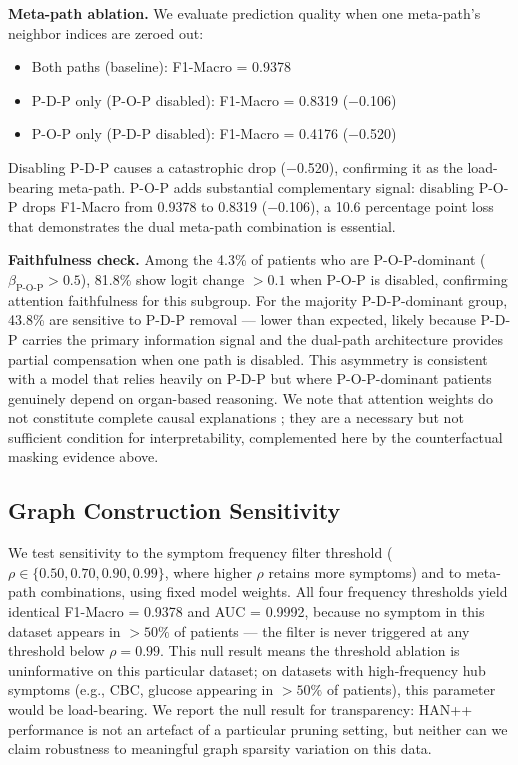 \documentclass[conference]{IEEEtran}
\begin{document}
\textbf{Meta-path ablation.}
We evaluate prediction quality when one meta-path's neighbor indices are zeroed out:
\begin{itemize}
  \item Both paths (baseline): F1-Macro = 0.9378
  \item P-D-P only (P-O-P disabled): F1-Macro = 0.8319 ($-$0.106)
  \item P-O-P only (P-D-P disabled): F1-Macro = 0.4176 ($-$0.520)
\end{itemize}
Disabling P-D-P causes a catastrophic drop ($-$0.520), confirming it as the
load-bearing meta-path.
P-O-P adds substantial complementary signal: disabling P-O-P drops
F1-Macro from 0.9378 to 0.8319 ($-$0.106), a 10.6 percentage point loss
that demonstrates the dual meta-path combination is essential.

\textbf{Faithfulness check.}
Among the 4.3\% of patients who are P-O-P-dominant
($\beta_{\text{P-O-P}} > 0.5$), 81.8\% show logit change $> 0.1$ when
P-O-P is disabled, confirming attention faithfulness for this subgroup.
For the majority P-D-P-dominant group, 43.8\% are sensitive to P-D-P
removal --- lower than expected, likely because P-D-P carries the primary
information signal and the dual-path architecture provides partial
compensation when one path is disabled.
This asymmetry is consistent with a model that relies heavily on P-D-P
but where P-O-P-dominant patients genuinely depend on organ-based
reasoning.
We note that attention weights do not constitute complete causal
explanations \cite{jain_2019}; they are a necessary but not sufficient
condition for interpretability, complemented here by the counterfactual
masking evidence above.

\subsection{Graph Construction Sensitivity}
\label{subsec:graph_sensitivity}

We test sensitivity to the symptom frequency filter threshold
($\rho \in \{0.50, 0.70, 0.90, 0.99\}$, where higher $\rho$ retains more symptoms)
and to meta-path combinations, using fixed model weights.
All four frequency thresholds yield identical F1-Macro = 0.9378 and AUC = 0.9992,
because no symptom in this dataset appears in $> 50\%$ of patients --- the
filter is never triggered at any threshold below $\rho = 0.99$.
This null result means the threshold ablation is uninformative on this
particular dataset; on datasets with high-frequency hub symptoms
(e.g., CBC, glucose appearing in $> 50\%$ of patients), this parameter
would be load-bearing.
We report the null result for transparency: HAN++ performance is not an
artefact of a particular pruning setting, but neither can we claim
robustness to meaningful graph sparsity variation on this data.
\end{document}
